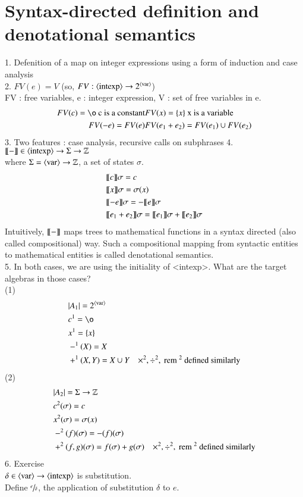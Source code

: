 \documentclass{report}[12pt]
\begin{document}
\section{Syntax-directed definition and denotational semantics}
1. Defenition of a map on integer expressions using a form of induction and case analysis \\
2. $FV(e) = V$ (so, $FV:\langle \text{intexp}\rangle \rightarrow 2^{\langle \text{var}\rangle}$) \\
FV : free variables, e : integer expression, V : set of free variables in e. \\
\begin{align*}
    FV(c) = \o \text{ c is a constant}& FV(x) = \{x\} \text{ x is a variable}\\
    FV(-e) = FV(e) & FV(e_1 + e_2) = FV(e_1) \cup FV(e_2)
\end{align*}
3. Two features : case analysis, recursive calls on subphrases
4. $\llbracket  -  \rrbracket \in \langle \text{intexp}\rangle \rightarrow \Sigma \rightarrow \mathbb{Z}$ \\
where $\Sigma = \langle \text{var}\rangle \rightarrow \mathbb{Z}$, a set of states $\sigma$. \\
\begin{align*}
    &\llbracket  c  \rrbracket \sigma = c \\
    &\llbracket  x  \rrbracket \sigma = \sigma(x) \\
    &\llbracket  -e  \rrbracket \sigma = - \llbracket  e  \rrbracket \sigma \\
    &\llbracket  e_1 + e_2  \rrbracket \sigma = \llbracket  e_1  \rrbracket \sigma + \llbracket  e_2  \rrbracket \sigma
\end{align*}
Intuitively, $\llbracket  -  \rrbracket$ maps trees to mathematical functions in a syntax directed (also called compositional) way. Such a compositional mapping from syntactic entities to mathematical entities is called denotational semantics. \\
5. In both cases, we are using the initiality of <intexp>. What are the target algebras in those cases? \\
(1) \begin{align*}
    &|A_1| = 2^{\nonterminal{var}} \\
    &c^1 = \o \\
    &x^1 = \{x\}\\
    &-^1 (X) = X \\
    &+^1 (X, Y) = X\cup Y & \times^2, \div^2, \rem^2 \text{ defined similarly}
\end{align*}
(2)
\begin{align*}
    &|A_2| = \Sigma \rightarrow \mathbb{Z} \\
    &c^2 (\sigma) = c\\
    &x^2 (\sigma) = \sigma(x) \\
    &-^2 (f)(\sigma) = -(f)(\sigma) \\
    &+^2 (f, g)(\sigma) = f(\sigma) + g(\sigma) & \times^2, \div^2, \text{ rem }^2 \text{ defined similarly}
\end{align*}
6. Exercise \\
$\delta \in \langle \text{var}\rangle \rightarrow \langle \text{intexp}\rangle$ is substitution. \\
Define $\sfrac{e}{\delta}$, the application of substitution $\delta$ to $e$.
\end{document}

